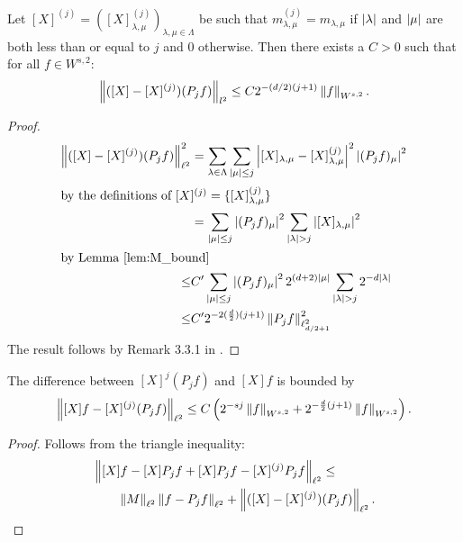 \begin{lemma} 
	Let $[X]^{(j)}=([X]^{(j)}_{\lambda,\mu})_{\lambda,\mu \in \Lambda}$ be such that $m^{(j)}_{\lambda,\mu} = m_{\lambda,\mu}$ if ${\lvert\lambda\rvert}$ and ${\lvert\mu\rvert}$ are both less than or equal to $j$ and $0$ otherwise. Then there exists a $C > 0$ such that for all $f \in W^{s,2}$:
	\begin{equation}
		\left\| ( [X]- [X]^{(j)})(P_j f) \right\|_{l^2} \leq C2^{-(d/2)(j+1)} \left\| f \right\|_{W^{s,2}}.
	\end{equation}
\end{lemma}
\begin{proof}
	\begin{align*}
		\left\| ([X]-[X]^{(j)})(P_j f) \right\|_{\ell^2}^2 &= \sum_{\lambda \in \Lambda} \sum_{{\lvert\mu\rvert}\leq j} \left| [X]_{\lambda,\mu}-[X]^{(j)}_{\lambda,\mu} \right|^2 \left| (P_j f)_\mu \right|^2 \\
	\intertext{by the definitions of $[X]^{(j)} = \{ [X]_{\lambda,\mu}^{(j)} \}$ }
		\qquad &= \sum_{{\lvert\mu\rvert}\leq j}\left| (P_j f)_\mu \right|^2 \sum_{{\lvert\lambda\rvert}>j}\left| [X]_{\lambda,\mu} \right|^2 \\
	\intertext{by Lemma \ref{lem:M_bound}}
		 \leq& C'\sum_{{\lvert\mu\rvert}\leq j}\left| (P_j f)_\mu \right|^2 2^{(d+2){\lvert\mu\rvert}}\sum_{{\lvert\lambda\rvert}>j}2^{-d{\lvert\lambda\rvert}} \\
		 \leq& C' 2^{-2(\frac{d}{2})(j+1)}\left\| P_j f \right\|^2_{\ell^2_{d/2+1}}
	\end{align*}
	The result follows by Remark 3.3.1 in \cite{Cohen2003}.
\end{proof}

\begin{corollary}
	The difference between $[X]^j (P_j f)$ and $[X] f$ is bounded by
	\[
		\left\| [X]f - [X]^{(j)}(P_j f) \right\|_{\ell^2} \leq C \left( 2^{-sj}\left\| f \right\|_{W^{s,2}} + 2^{-\frac{d}{2}(j+1)}\left\| f \right\|_{W^{s,2}} \right).
	\]
\end{corollary}
\begin{proof}
	Follows from the triangle inequality:
	\begin{align*}
		&\left\| [X]f - [X] P_j f + [X] P_j f - [X]^{(j)} P_j f \right\|_{\ell^2} \leq \\
		&\qquad \left\| M \right\|_{\ell^2} \left\| f - P_j f \right\|_{\ell^2} + \left\| ([X]-[X]^{(j)})(P_j f) \right\|_{\ell^2}.
	\end{align*}
\end{proof}


